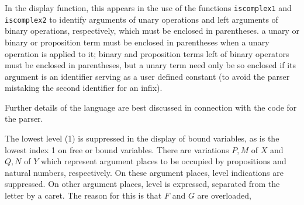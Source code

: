 \documentclass{article}
\begin{document}
In the display function, this appears in the use of the functions {\tt iscomplex1} and {\tt iscomplex2} to identify arguments of unary operations and left arguments of binary operations, respectively, which must be enclosed in parentheses.  a unary or binary or proposition term must be enclosed
in parentheses when a unary operation is applied to it;  binary and proposition terms left of binary operators must be enclosed in parentheses, 
but a unary term need only be so enclosed if its argument is an identifier serving as a user defined constant (to avoid the parser mistaking the second identifier for an infix).


Further details of the language are best discussed in connection with the code for the parser.

The lowest level (1) is suppressed in the display of bound variables, as is the lowest index 1 on free or bound variables.  There are variations $P,M$ of $X$  and $Q,N$ of $Y$ which represent
argument places to be occupied by propositions and natural numbers, respectively.  On these argument places, level indications are suppressed.
On other argument places, level is expressed, separated from the letter by a caret.  The reason for this is that $F$ and $G$ are overloaded,
\end{document}
